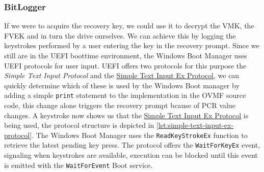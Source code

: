 \subsubsection{BitLogger}

If we were to acquire the recovery key, we could use it to decrypt the \ac{VMK}, the \ac{FVEK} and in turn the drive ourselves.
We can achieve this by logging the keystrokes performed by a user entering the key in the recovery prompt.
Since we still are in the \ac{UEFI} boottime environment, the Windows Boot Manager uses \ac{UEFI} protocols for user input.
\ac{UEFI} offers two protocols for this purpose the \emph{Simple Text Input Protocol} and the \hyperref[lst:simple-text-input-ex-protocol]{Simple Text Input Ex Protocol}, we can quickly determine which of these is used by the Windows Boot manager by adding a simple \lstinline{print} statement to the implementation in the \ac{OVMF} source code, this change alone triggers the recovery prompt bcause of \ac{PCR} value changes.
A keystroke now shows us that the \hyperref[lst:simple-text-input-ex-protocol]{Simple Text Input Ex Protocol} is being used, the protocol structure is depicted in \autoref{lst:simple-text-input-ex-protocol}.
The Windows Boot Manager uses the \lstinline{ReadKeyStrokeEx} function to retrieve the latest pending key press.
The protocol offers the \lstinline{WaitForKeyEx} event, signaling when keystrokes are available, execution can be blocked until this event is emitted with the \lstinline{WaitForEvent} Boot service.


